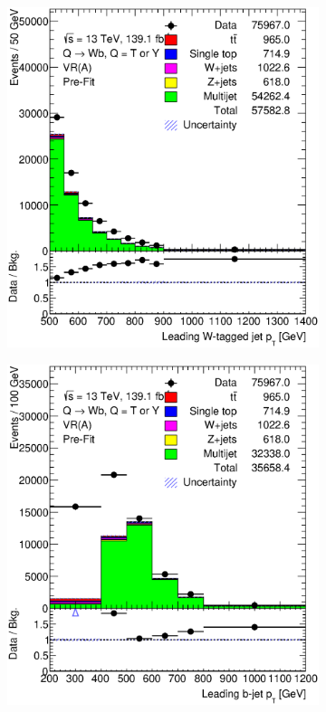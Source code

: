 \begin{figure}[hbt!]
	\centering
	\graphicspath{{figs/chapter5/postfitbinbybin/}}
	\begin{subfigure}{.35\textwidth}
		\centering
		\includegraphics[width=\linewidth,height=\textheight,keepaspectratio]{VR_B_ljet_pt.eps}
		\caption{}
		\label{fig:abcd:furtherimprovement:scaledcorr:ljet_pt}
	\end{subfigure}\hspace{0.6cm}
	\begin{subfigure}{.35\textwidth}
		\centering
		\includegraphics[width=\linewidth,height=\textheight,keepaspectratio]{VR_B_jet_pt.eps}

\end{subfigure}
\end{figure}

